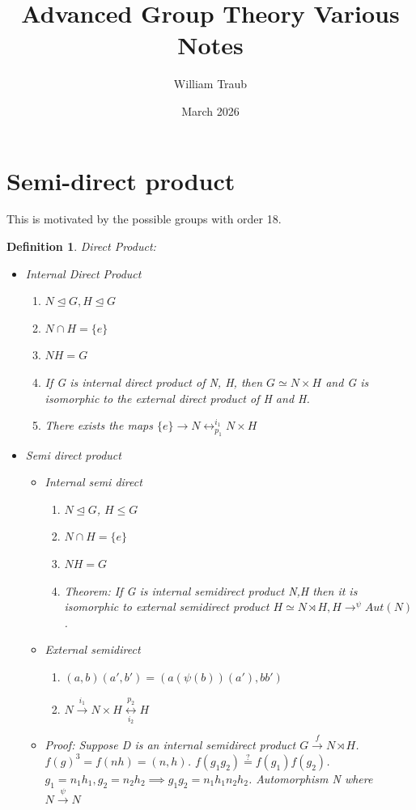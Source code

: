 \documentclass{article}
\title{Advanced Group Theory Various Notes}
\author{William Traub}
\date{March 2026}
\newtheorem{definition}{Definition}
\begin{document}
\maketitle
\section{Semi-direct product}
This is motivated by the possible groups with order 18.
\begin{definition}
  Direct Product:
  \begin{itemize}
    \item Internal Direct Product
    \begin{enumerate}
      \item $N \trianglelefteq G, H \trianglelefteq G$
      \item $N \cap H = \{ e\}$
      \item $NH = G$
      \item If G is internal direct product of N, H, then $G \simeq N \times H$ and G is isomorphic to the external direct product of H and H.
      \item There exists the maps $\{e\} \to N \leftrightarrow_{p_1}^{i_1} N \times H$
    \end{enumerate}
    \item Semi direct product
    \begin{itemize}
      \item Internal semi direct
      \begin{enumerate}
        \item $N \trianglelefteq G$, $H \leq G$
        \item $N \cap H = \{e\}$
        \item $NH=G$
        \item Theorem: If G is internal semidirect product N,H then it is isomorphic to external semidirect product $H \simeq N \rtimes H, H \to^{\psi} Aut(N)$.
        \end{enumerate}
        \item External semidirect
        \begin{enumerate}
          \item $(a,b)(a',b') = (a (\psi (b))(a'), bb')$
          \item $N \overset{i_1}{\to} N \times H \underset{i_2}{\overset{p_2}{\leftrightarrow}} H$
        \end{enumerate}
        \item Proof: Suppose D is an internal semidirect product $G \overset{f}{\to} N \rtimes H$. $f(g)^3 = f(nh) = (n, h)$. $f(g_1 g_2) \overset{?}{=} f(g_1)f(g_2)$. $g_1 = n_1 h_1, g_2 = n_2h_2 \implies g_1g_2 = n_1h_1n_2h_2$. Automorphism N where 
        \\
        $N \overset{\psi}{\to} N$
    \end{itemize}
  \end{itemize}
\end{definition}
\newpage
\end{document}
